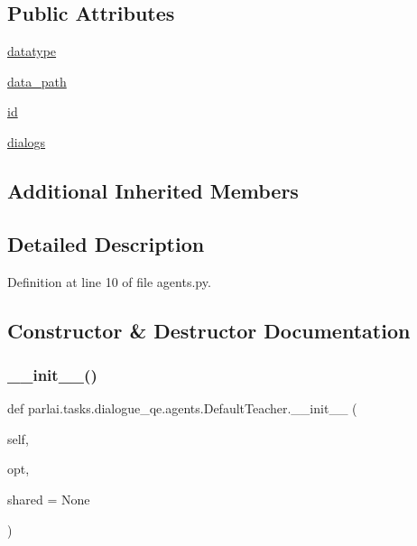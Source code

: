 \subsection*{Public Attributes}
\begin{DoxyCompactItemize}
\item 
\hyperlink{classparlai_1_1tasks_1_1dialogue__qe_1_1agents_1_1DefaultTeacher_a8eace6f1c9861d2e153398f1e65ddcd9}{datatype}
\item 
\hyperlink{classparlai_1_1tasks_1_1dialogue__qe_1_1agents_1_1DefaultTeacher_a18ebf9bfac4f5585c7413bd566030a0c}{data\+\_\+path}
\item 
\hyperlink{classparlai_1_1tasks_1_1dialogue__qe_1_1agents_1_1DefaultTeacher_a8f8ccd686c7a9b8e92a0de772b13a55b}{id}
\item 
\hyperlink{classparlai_1_1tasks_1_1dialogue__qe_1_1agents_1_1DefaultTeacher_a313b63d94f39392184547a7bc202ad7d}{dialogs}
\end{DoxyCompactItemize}
\subsection*{Additional Inherited Members}


\subsection{Detailed Description}


Definition at line 10 of file agents.\+py.



\subsection{Constructor \& Destructor Documentation}
\mbox{\label{classparlai_1_1tasks_1_1dialogue__qe_1_1agents_1_1DefaultTeacher_a0c1e9213010eca7835baa3507a241c09}} 
\subsubsection{\texorpdfstring{\+\_\+\+\_\+init\+\_\+\+\_\+()}{\_\_init\_\_()}}
{\footnotesize\ttfamily def parlai.\+tasks.\+dialogue\+\_\+qe.\+agents.\+Default\+Teacher.\+\_\+\+\_\+init\+\_\+\+\_\+ (\begin{DoxyParamCaption}\item[{}]{self,  }\item[{}]{opt,  }\item[{}]{shared = {\ttfamily None} }\end{DoxyParamCaption})}



